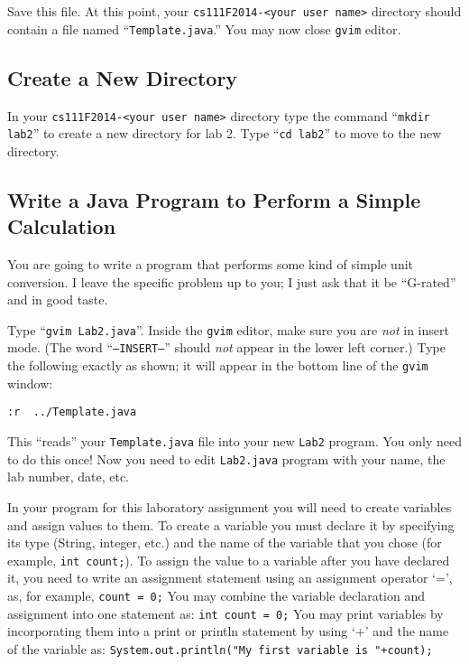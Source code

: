\noindent Save this file. At this point, your {\tt cs111F2014-<your user name>} directory should contain a file named
``{\tt Template.java}.'' You may now close {\tt gvim} editor.

\subsection*{Create a New Directory}

In your {\tt cs111F2014-<your user name>} directory type the command ``{\tt mkdir lab2}'' to create a new directory for lab 2.
\noindent Type ``{\tt cd lab2}'' to move to the new directory.  

\subsection*{Write a Java Program to Perform a Simple Calculation}
You are going to write a program that performs some kind of simple unit
conversion. I leave the specific problem up to you; I just ask that it be 
``G-rated'' and in good taste.

 Type ``{\tt gvim Lab2.java}''. Inside the
{\tt gvim} editor, make sure you are {\em not} in insert mode. (The word
``{\tt --INSERT--}'' should {\em not} appear in the lower left corner.) Type the
following exactly as shown; it will appear in the bottom line of the {\tt gvim}
window:
\begin{center}
\verb$:r  ../Template.java$
\end{center}
This ``reads'' your {\tt Template.java} file into your new {\tt Lab2} program.
You only need to do this once!  Now you need to edit {\tt Lab2.java} program with your name, the lab number, date, etc.

\noindent In your program for this laboratory assignment you will need to create variables and assign values to them. To create a variable you must declare it by specifying its type (String, integer, etc.) and the name of the variable that you chose (for example, {\tt int count;}). 
To assign the value to a variable after you have declared it, you need to write an assignment statement using an assignment operator `=', as, for example, {\tt count  = 0;} 
You may combine the variable declaration and assignment into one statement as: 
{\tt int count = 0;} 
You may print variables by incorporating them into a print or println statement by using `+' and the name of the variable as: {\tt System.out.println("My first variable is "+count);} 

